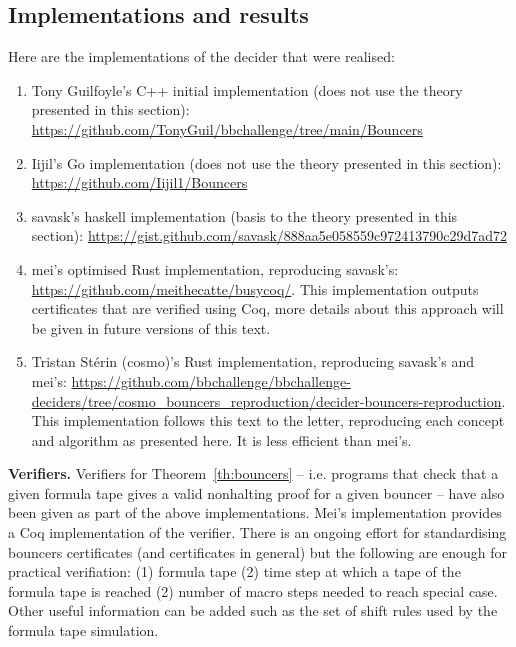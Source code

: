 \subsection{Implementations and results}\label{sec:bouncers-implem}


Here are the implementations of the decider that were realised:

\begin{enumerate}
    \item Tony Guilfoyle's C++ initial implementation (does not use the theory presented in this section): \url{https://github.com/TonyGuil/bbchallenge/tree/main/Bouncers}
    \item Iijil's Go implementation (does not use the theory presented in this section): \url{https://github.com/Iijil1/Bouncers}
    \item savask's haskell implementation (basis to the theory presented in this section): \url{https://gist.github.com/savask/888aa5e058559c972413790c29d7ad72}
    \item mei's optimised Rust implementation, reproducing savask's: \url{https://github.com/meithecatte/busycoq/}. This implementation outputs certificates that are verified using Coq, more details about this approach will be given in future versions of this text.
    \item Tristan Stérin (cosmo)'s Rust implementation, reproducing savask's and mei's: \url{https://github.com/bbchallenge/bbchallenge-deciders/tree/cosmo_bouncers_reproduction/decider-bouncers-reproduction}. This implementation follows this text to the letter, reproducing each concept and algorithm as presented here. It is less efficient than mei's.


\end{enumerate}


\textbf{Verifiers.} Verifiers for Theorem~\ref{th:bouncers} -- i.e. programs that check that a given formula tape gives a valid nonhalting proof for a given bouncer -- have also been given as part of the above implementations. Mei's implementation provides a Coq implementation of the verifier. There is an ongoing effort for standardising bouncers certificates (and certificates in general) but the following are enough for practical verifiation: (1) formula tape (2) time step at which a tape of the formula tape is reached (2) number of macro steps needed to reach special case. Other useful information can be added such as the set of shift rules used by the formula tape simulation.

